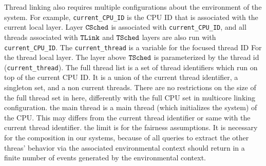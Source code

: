 Thread linking also requires multiple configurations about 
the environment of the system. 
For example, \lstinline$current_CPU_ID$ is the CPU ID that is 
associated with the current local layer.
Layer ${{\mathrm{\texttt{CSched}}}}$ is associated with \lstinline$current_CPU_ID$, 
and all threads associated with ${{\mathrm{\texttt{TLink}}}}$ and ${{\mathrm{\texttt{TSched}}}}$ layers 
are also run with  \lstinline$current_CPU_ID$.
The \lstinline$current_thread$ 
is a variable for the focused thread ID For the thread local layer. 
The layer above ${{\mathrm{\texttt{TSched}}}}$ is parameterized by the thread id (\lstinline$current_thread$). 
The full thread list is a set of thread identifiers 
which run on top of the current CPU ID. 
It is a union of the current thread identifier, a singleton set, 
and a non current threads. 
There are no restrictions on the size of the full thread set in here,
differently with the full CPU set in multicore linking configuration.
the main thread is a main thread (which initializes the system) of the CPU. 
This may differs from the current thread identifier or same with the current thread identifier.
the limit is for the fairness assumptions. 
It is necessary for the composition in our systems, 
because of all queries to extract the other threas' behavior via the associated environmental context 
should return in a finite number of events generated by the environmental context. 

